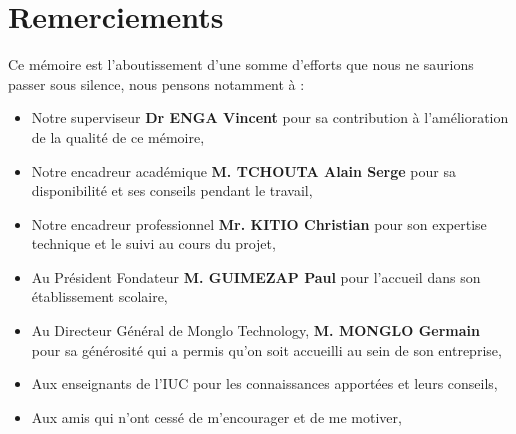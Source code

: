 \chapter*{Remerciements}         %

Ce mémoire est l'aboutissement d'une somme d'efforts que nous ne saurions passer sous silence, nous pensons notamment à :

\begin{itemize}
    \item Notre superviseur \textbf{Dr ENGA Vincent} pour sa contribution à l'amélioration de la qualité de ce mémoire,
    \item Notre encadreur académique  \textbf{M. TCHOUTA Alain Serge} pour sa disponibilité et ses conseils pendant le travail,
    \item  Notre encadreur professionnel \textbf{Mr. KITIO Christian} pour son expertise technique et le suivi au cours du projet,
    \item Au Président Fondateur \textbf{M. GUIMEZAP Paul} pour l’accueil dans son établissement scolaire,
    \item Au Directeur Général de Monglo Technology, \textbf{M. MONGLO Germain} pour sa générosité qui a permis qu'on soit accueilli au sein de son entreprise,
    \item Aux enseignants de l’IUC pour les connaissances apportées et leurs conseils,
    \item Aux amis qui n’ont cessé de m’encourager et de me motiver,
\end{itemize}